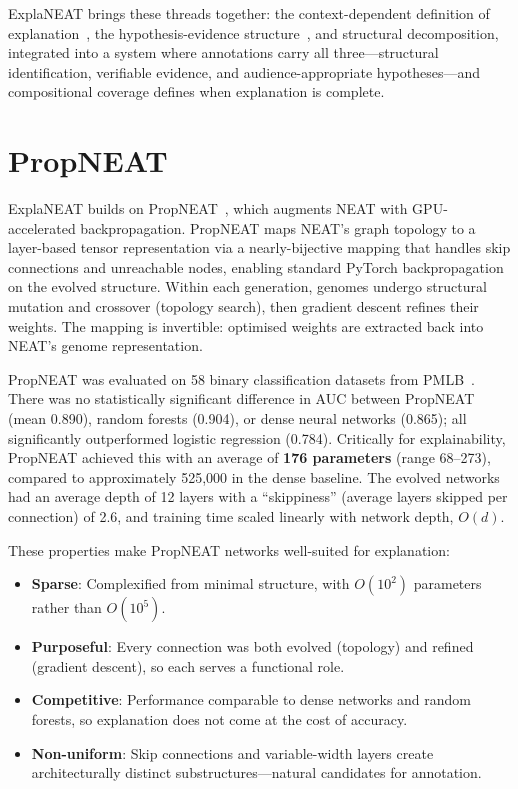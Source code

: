 \documentclass[11pt]{article}
\begin{document}
ExplaNEAT brings these threads together: the context-dependent definition of explanation~\cite{merry2021mental}, the hypothesis-evidence structure~\cite{miller2023evaluative,le2024evaluative}, and structural decomposition, integrated into a system where annotations carry all three---structural identification, verifiable evidence, and audience-appropriate hypotheses---and compositional coverage defines when explanation is complete.


\section{PropNEAT}
\label{sec:algorithm}

ExplaNEAT builds on PropNEAT~\cite{merry2025propneat}, which augments NEAT with GPU-accelerated backpropagation. PropNEAT maps NEAT's graph topology to a layer-based tensor representation via a nearly-bijective mapping that handles skip connections and unreachable nodes, enabling standard PyTorch backpropagation on the evolved structure. Within each generation, genomes undergo structural mutation and crossover (topology search), then gradient descent refines their weights. The mapping is invertible: optimised weights are extracted back into NEAT's genome representation.

PropNEAT was evaluated on 58 binary classification datasets from PMLB~\cite{olson2017pmlb}. There was no statistically significant difference in AUC between PropNEAT (mean 0.890), random forests (0.904), or dense neural networks (0.865); all significantly outperformed logistic regression (0.784). Critically for explainability, PropNEAT achieved this with an average of \textbf{176 parameters} (range 68--273), compared to approximately 525,000 in the dense baseline. The evolved networks had an average depth of 12 layers with a ``skippiness'' (average layers skipped per connection) of 2.6, and training time scaled linearly with network depth, $O(d)$.

These properties make PropNEAT networks well-suited for explanation:
\begin{itemize}
    \item \textbf{Sparse}: Complexified from minimal structure, with $O(10^2)$ parameters rather than $O(10^5)$.
    \item \textbf{Purposeful}: Every connection was both evolved (topology) and refined (gradient descent), so each serves a functional role.
    \item \textbf{Competitive}: Performance comparable to dense networks and random forests, so explanation does not come at the cost of accuracy.
    \item \textbf{Non-uniform}: Skip connections and variable-width layers create architecturally distinct substructures---natural candidates for annotation.
\end{itemize}
\end{document}
